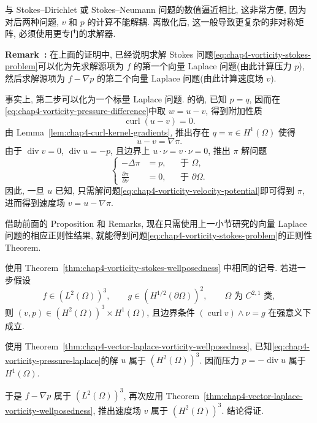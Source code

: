 与 Stokes--Dirichlet 或 Stokes--Neumann 问题的数值逼近相比, 这非常方便, 因为对后两种问题, $v$ 和 $p$ 的计算不能解耦. 离散化后, 这一般导致更复杂的非对称矩阵, 必须使用更专门的求解器.

\par\noindent{}\textbf{Remark~\thechapterfoursectionnineremark:}\label{rem:chap4-vorticity-second-step-scalar}\quad
在上面的证明中, 已经说明求解 Stokes 问题\eqref{eq:chap4-vorticity-stokes-problem}可以化为先求解源项为 $f$ 的第一个向量 Laplace 问题(由此计算压力 $p$), 然后求解源项为 $f-\nabla p$ 的第二个向量 Laplace 问题(由此计算速度场 $v$).

事实上, 第二步可以化为一个标量 Laplace 问题. 的确, 已知 $p=q$, 因而在\eqref{eq:chap4-vorticity-pressure-difference}中取 $w=u-v$, 得到附加性质
\[
 \operatorname{curl}(u-v)=0.
\]
由 Lemma~\ref{lem:chap4-curl-kernel-gradients}, 推出存在 $q=\pi\in H^1(\Omega)$ 使得
\[
 u-v=\nabla\pi.
\]
由于 $\operatorname{div}v=0$, $\operatorname{div}u=-p$, 且边界上 $u\cdot\nu=v\cdot\nu=0$, 推出 $\pi$ 解问题
\begin{equation}
 \left\{
 \begin{aligned}
  -\Delta\pi&=p,&&\text{于 }\Omega,\\
  \frac{\partial\pi}{\partial\nu}&=0,&&\text{于 }\partial\Omega.
 \end{aligned}
 \right.
 \label{eq:chap4-vorticity-velocity-potential}
\end{equation}
因此, 一旦 $u$ 已知, 只需解问题\eqref{eq:chap4-vorticity-velocity-potential}即可得到 $\pi$, 进而得到速度场 $v=u-\nabla\pi$.

借助前面的 Proposition 和 Remarks, 现在只需使用上一小节研究的向量 Laplace 问题的相应正则性结果, 就能得到问题\eqref{eq:chap4-vorticity-stokes-problem}的正则性 Theorem.

\begin{Theorem}
\label{thm:chap4-vorticity-stokes-regularity}
使用 Theorem~\ref{thm:chap4-vorticity-stokes-wellposedness} 中相同的记号. 若进一步假设
\[
 f\in(L^2(\Omega))^3,
 \qquad g\in(H^{1/2}(\partial\Omega))^2,
 \qquad\Omega\text{ 为 }C^{2,1}\text{ 类},
\]
则 $(v,p)\in(H^2(\Omega))^3\times H^1(\Omega)$, 且边界条件 $(\operatorname{curl}v)\wedge\nu=g$ 在强意义下成立.
\end{Theorem}

\begin{Proof}
使用 Theorem~\ref{thm:chap4-vector-laplace-vorticity-wellposedness}, 已知\eqref{eq:chap4-vorticity-pressure-laplace}的解 $u$ 属于 $(H^2(\Omega))^3$. 因而压力 $p=-\operatorname{div}u$ 属于 $H^1(\Omega)$.

于是 $f-\nabla p$ 属于 $(L^2(\Omega))^3$, 再次应用 Theorem~\ref{thm:chap4-vector-laplace-vorticity-wellposedness}, 推出速度场 $v$ 属于 $(H^2(\Omega))^3$. 结论得证.
\end{Proof}

